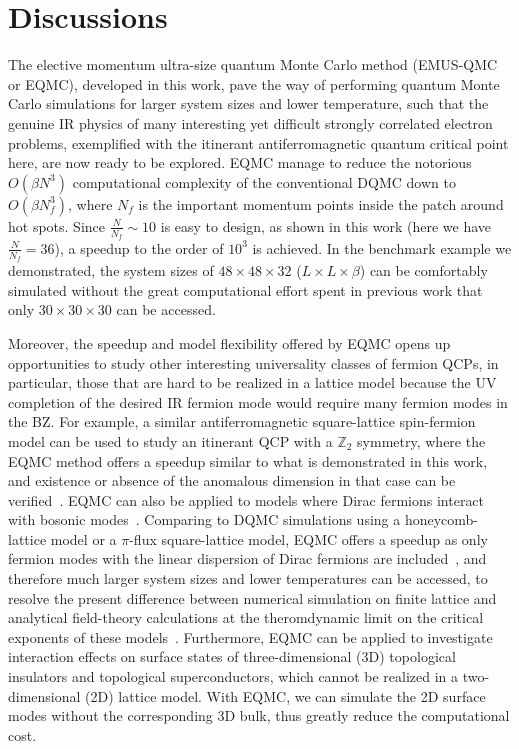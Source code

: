 \documentclass[aps,prx,twocolumn,superscriptaddress,showpacs,floatfix]{revtex4-1}
\begin{document}
\section{Discussions}
\label{sec:conclusion}
The elective momentum ultra-size quantum Monte Carlo method (EMUS-QMC or EQMC), developed in this work, pave the way of performing quantum Monte Carlo simulations for larger system sizes and lower temperature, such that the genuine IR physics of many interesting yet difficult strongly correlated electron problems, exemplified with the itinerant antiferromagnetic quantum critical point here, are now ready to be explored. EQMC manage to reduce the notorious $O(\beta N^3)$ computational complexity of the conventional DQMC down to $O(\beta N^3_f)$, where $N_f$ is the important momentum points inside the patch around hot spots. Since $\frac{N}{N_f} \sim 10$ is easy to design, as shown in this work (here we have $\frac{N}{N_f}=36$), a speedup to the order of $10^3$ is achieved. In the benchmark example we demonstrated, the system sizes of $48\times48\times32$ ($L\times L\times \beta$) can be comfortably simulated without the great computational effort spent in previous work that only $30\times30\times30$ can be accessed.

Moreover, the speedup and model flexibility offered by EQMC opens up opportunities to study other interesting universality classes of fermion QCPs, in particular, those that are hard to be realized in a lattice model because the UV completion of the desired IR fermion mode would require many fermion modes in the BZ.
For example, a similar antiferromagnetic square-lattice spin-fermion model can be used to study an itinerant QCP with a $\mathbb Z_2$ symmetry, where the EQMC method offers a speedup similar to what is demonstrated in this work, and existence or absence of the anomalous dimension in that case can be verified~\cite{ZiHongLiu201808}.
EQMC can also be applied to models where Dirac fermions interact with bosonic modes~\cite{Xu2016a,He2017}. Comparing to DQMC simulations using a honeycomb-lattice model or a $\pi$-flux square-lattice model, EQMC offers a speedup as only fermion modes with the linear dispersion of Dirac fermions are included~\cite{Lang2018}, and therefore much larger system sizes and lower temperatures can be accessed, to resolve the present difference between numerical simulation on finite lattice and analytical field-theory calculations at the theromdynamic limit on the critical exponents of these models~\cite{Iliesiu2016,Iliesiu2017,Zerf2017,Ihrig2018}. Furthermore, EQMC can be applied to investigate interaction effects on surface states of three-dimensional (3D) topological insulators and topological superconductors, which cannot be realized in a two-dimensional (2D) lattice model. With EQMC, we can simulate the 2D surface modes without the corresponding 3D bulk, thus greatly reduce the computational cost.
\end{document}
